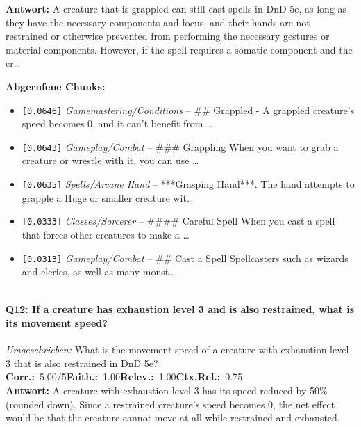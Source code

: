 \noindent\textbf{Antwort:} A creature that is grappled can still cast spells in DnD 5e, as long as they have the necessary components and focus, and their hands are not restrained or otherwise prevented from performing the necessary gestures or material components. However, if the spell requires a somatic component and the cr\ldots

\noindent\textbf{Abgerufene Chunks:}
\begin{itemize}[noitemsep, topsep=2pt]
  \item[\textbf{\#1}] \texttt{[0.0646]} \textit{Gamemastering/Conditions} -- \#\# Grappled  - A grappled creature's speed becomes 0, and it can't benefit from \ldots
  \item[\textbf{\#2}] \texttt{[0.0643]} \textit{Gameplay/Combat} -- \#\#\# Grappling  When you want to grab a creature or wrestle with it, you can use \ldots
  \item[\textbf{\#3}] \texttt{[0.0635]} \textit{Spells/Arcane Hand} -- ***Grasping Hand***. The hand attempts to grapple a Huge or smaller creature wit\ldots
  \item[\textbf{\#4}] \texttt{[0.0333]} \textit{Classes/Sorcerer} -- \#\#\#\# Careful Spell  When you cast a spell that forces other creatures to make a \ldots
  \item[\textbf{\#5}] \texttt{[0.0313]} \textit{Gameplay/Combat} -- \#\# Cast a Spell  Spellcasters such as wizards and clerics, as well as many monst\ldots
\end{itemize}
\vspace{4pt}
\hrule
\vspace{6pt}

\paragraph{Q12: If a creature has exhaustion level 3 and is also restrained, what is its movement speed?}
\textit{Umgeschrieben:} What is the movement speed of a creature with exhaustion level 3 that is also restrained in DnD 5e?\\[2pt]
\noindent \textbf{Corr.:}~5.00/5\quad \textbf{Faith.:}~1.00\quad \textbf{Relev.:}~1.00\quad \textbf{Ctx.Rel.:}~0.75\\

\noindent\textbf{Antwort:} A creature with exhaustion level 3 has its speed reduced by 50\% (rounded down). Since a restrained creature's speed becomes 0, the net effect would be that the creature cannot move at all while restrained and exhausted.

